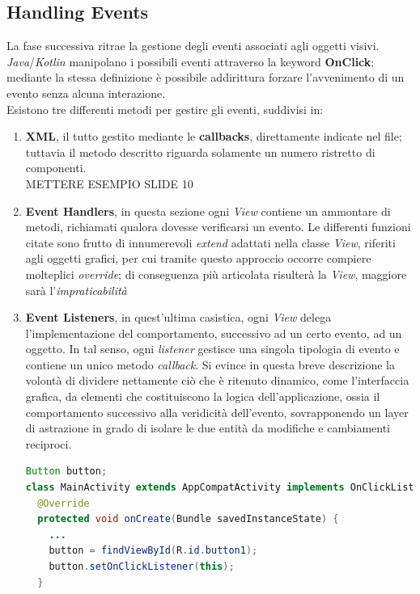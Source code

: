 \documentclass{article}
\begin{document}
\subsection*{Handling Events}
La fase successiva ritrae la gestione degli eventi associati agli oggetti visivi. \textit{Java}/\textit{Kotlin} manipolano i possibili eventi attraverso la keyword \textbf{OnClick}; mediante la stessa definizione è possibile addirittura forzare l'avvenimento di un evento senza alcuna interazione.\vspace*{14pt}\\
Esistono tre differenti metodi per gestire gli eventi, suddivisi in:
\begin{enumerate}
  \itemsep0em
  \renewcommand{\labelenumi}{-}
  \item \textbf{XML}, il tutto gestito mediante le \textbf{callbacks}, direttamente indicate nel file; tuttavia il metodo descritto riguarda solamente un numero ristretto di componenti. \\METTERE ESEMPIO SLIDE 10
  \item \textbf{Event Handlers}, in questa sezione ogni \textit{View} contiene un ammontare di metodi, richiamati qualora dovesse verificarsi un evento. Le differenti funzioni citate sono frutto di innumerevoli \textit{extend} adattati nella classe \textit{View}, riferiti agli oggetti grafici, per cui tramite questo approccio occorre compiere molteplici \textit{override}; di conseguenza più articolata risulterà la \textit{View}, maggiore sarà l'\textit{impraticabilità}
  \item \textbf{Event Listeners}, in quest'ultima casistica, ogni \textit{View} delega l'implementazione del comportamento, successivo ad un certo evento, ad un oggetto. In tal senso, ogni \textit{listener} gestisce una singola tipologia di evento e contiene un unico metodo \textit{callback}. Si evince in questa breve descrizione la volontà di dividere nettamente ciò che è ritenuto dinamico, come l'interfaccia grafica, da elementi che costituiscono la logica dell'applicazione, ossia il comportamento successivo alla veridicità dell'evento, sovrapponendo un layer di astrazione in grado di isolare le due entità da modifiche e cambiamenti reciproci. \\
  \begin{lstlisting}[language=JAVA, title=Gestione evento tramite Event Listener]
Button button;
class MainActivity extends AppCompatActivity implements OnClickListener{
  @Override
  protected void onCreate(Bundle savedInstanceState) {
    ...
    button = findViewById(R.id.button1);
    button.setOnClickListener(this); 
  }


\end{lstlisting}
\end{enumerate}
\end{document}
